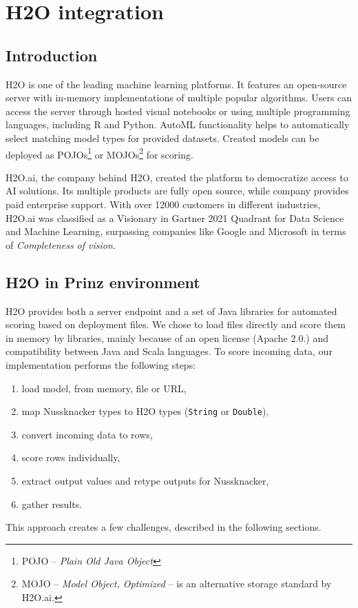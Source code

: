 \chapter{H2O integration}
\label{chap:h2o}

\section{Introduction}

H2O is one of the leading machine learning platforms.
It features an open-source server with in-memory implementations of multiple popular algorithms.
Users can access the server through hosted visual notebooks or using multiple programming languages, including R and Python.
AutoML functionality helps to automatically select matching model types for provided datasets.
Created models can be deployed as
POJOs\footnote{POJO -- \emph{Plain Old Java Object}}
or MOJOs\footnote{MOJO -- \emph{Model Object, Optimized} -- is an alternative storage standard by H2O.ai.}
for scoring.

H2O.ai, the company behind H2O, created the platform to democratize access to AI solutions.
Its multiple products are fully open source, while company provides paid enterprise support.
With over 12000 customers in different industries, H2O.ai was classified as a Visionary in Gartner 2021 Quadrant for Data Science and Machine Learning, surpassing companies like Google and Microsoft in terms of \emph{Completeness of vision}.

\section{H2O in Prinz environment}

H2O provides both a server endpoint and a set of Java libraries for automated scoring based on deployment files.
We chose to load files directly and score them in memory by libraries, mainly because of an open license (Apache 2.0.) and compatibility between Java and Scala languages.
To score incoming data, our implementation performs the following steps:
\begin{enumerate}
  \item load model, from memory, file or URL,
  \item map Nussknacker types to H2O types (\texttt{String} or \texttt{Double}),
  \item convert incoming data to rows,
  \item score rows individually,
  \item extract output values and retype outputs for Nussknacker,
  \item gather results.
\end{enumerate}
This approach creates a few challenges, described in the following sections.

